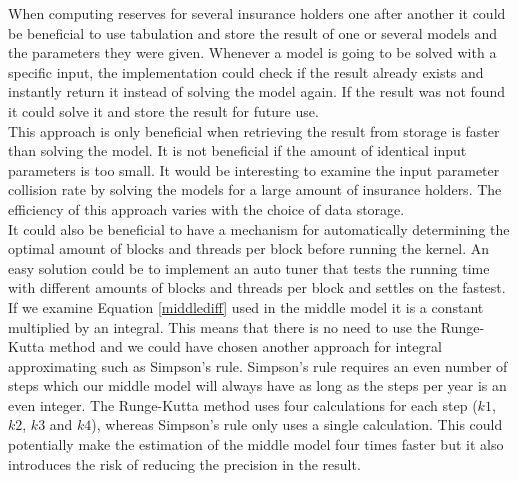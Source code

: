 


When computing reserves for several insurance holders one after another it could be beneficial to use tabulation and store the result of one or several models and the parameters they were given. Whenever a model is going to be solved with a specific input, the implementation could check if the result already exists and instantly return it instead of solving the model again. If the result was not found it could solve it and store the result for future use. \\ 

This approach is only beneficial when retrieving the result from storage is faster than solving the model. It is not beneficial if the amount of identical input parameters is too small. It would be interesting to examine the input parameter collision rate by solving the models for a large amount of insurance holders. The efficiency of this approach varies with the choice of data storage. \\

It could also be beneficial to have a mechanism for automatically determining the optimal amount of blocks and threads per block before running the kernel. An easy solution could be to implement an auto tuner that tests the running time with different amounts of blocks and threads per block and settles on the fastest. \\

If we examine Equation \ref{middlediff} used in the middle model it is a constant multiplied by an integral. This means that there is no need to use the Runge-Kutta method and we could have chosen another approach for integral approximating such as Simpson's rule\cite{simp}. Simpson's rule requires an even number of steps which our middle model will always have as long as the steps per year is an even integer. The Runge-Kutta method uses four calculations for each step ($k1$, $k2$, $k3$ and $k4$), whereas Simpson's rule only uses a single calculation. This could potentially make the estimation of the middle model four times faster but it also introduces the risk of reducing the precision in the result. 
